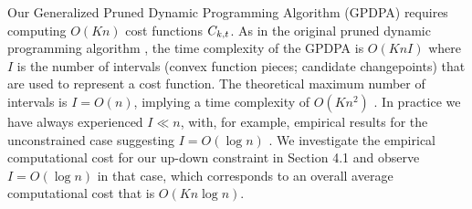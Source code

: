 \documentclass[aoas]{imsart}
\begin{document}
Our Generalized Pruned Dynamic Programming Algorithm (GPDPA) requires
computing $O(Kn)$ cost functions $C_{k,t}$. As in the original
pruned dynamic programming algorithm \citep{pruned-dp}, the time
complexity of the GPDPA is $O(K n I)$ where $I$ is the number of
intervals (convex function pieces; candidate changepoints) that are
used to represent a cost function. The theoretical maximum number of
intervals is $I=O(n)$, implying a time complexity of $O(K n^2)$
\citep{pruned-dp-new}.
In practice we have always experienced $I\ll n$, with, for example,
empirical results for the unconstrained case suggesting $I=O(\log
n)$ \citep{fpop}. We investigate the empirical computational cost for our up-down
constraint in Section 4.1 and observe $I=O(\log n)$ in that case,
which corresponds to an overall average computational cost that is
$O(Kn\log n)$.
\end{document}
